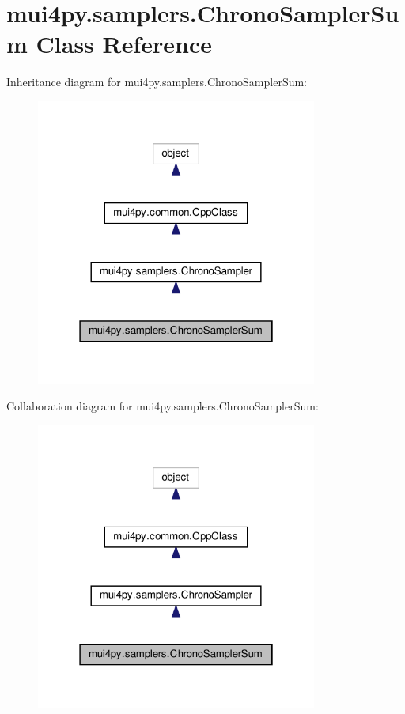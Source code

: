 \hypertarget{classmui4py_1_1samplers_1_1_chrono_sampler_sum}{}\section{mui4py.\+samplers.\+Chrono\+Sampler\+Sum Class Reference}
\label{classmui4py_1_1samplers_1_1_chrono_sampler_sum}


Inheritance diagram for mui4py.\+samplers.\+Chrono\+Sampler\+Sum\+:
\nopagebreak
\begin{figure}[H]
\begin{center}
\leavevmode
\includegraphics[width=262pt]{classmui4py_1_1samplers_1_1_chrono_sampler_sum__inherit__graph}
\end{center}
\end{figure}


Collaboration diagram for mui4py.\+samplers.\+Chrono\+Sampler\+Sum\+:
\nopagebreak
\begin{figure}[H]
\begin{center}
\leavevmode
\includegraphics[width=262pt]{classmui4py_1_1samplers_1_1_chrono_sampler_sum__coll__graph}
\end{center}
\end{figure}
